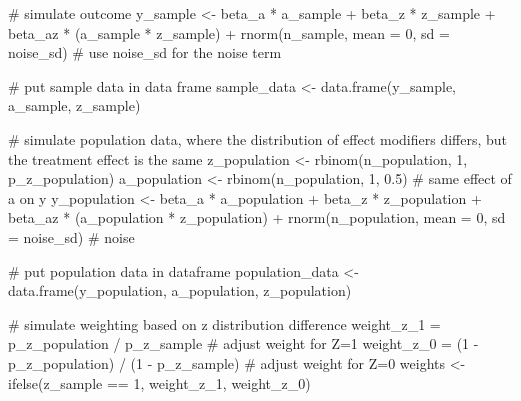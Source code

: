 \documentclass[
  singlecolumn]{article}
\newenvironment{Shaded}{\begin{snugshade}}{\end{snugshade}}
\newcommand{\AttributeTok}[1]{\textcolor[rgb]{0.40,0.45,0.13}{#1}}
\newcommand{\CommentTok}[1]{\textcolor[rgb]{0.37,0.37,0.37}{#1}}
\newcommand{\DecValTok}[1]{\textcolor[rgb]{0.68,0.00,0.00}{#1}}
\newcommand{\FloatTok}[1]{\textcolor[rgb]{0.68,0.00,0.00}{#1}}
\newcommand{\FunctionTok}[1]{\textcolor[rgb]{0.28,0.35,0.67}{#1}}
\newcommand{\NormalTok}[1]{\textcolor[rgb]{0.00,0.23,0.31}{#1}}
\newcommand{\OtherTok}[1]{\textcolor[rgb]{0.00,0.23,0.31}{#1}}
\newcommand{\SpecialCharTok}[1]{\textcolor[rgb]{0.37,0.37,0.37}{#1}}
\begin{document}
\begin{Shaded}
\begin{Highlighting}[]
  \CommentTok{\# simulate outcome}
\NormalTok{  y\_sample }\OtherTok{\textless{}{-}}\NormalTok{ beta\_a }\SpecialCharTok{*}\NormalTok{ a\_sample }\SpecialCharTok{+}\NormalTok{ beta\_z }\SpecialCharTok{*}\NormalTok{ z\_sample }\SpecialCharTok{+}\NormalTok{ beta\_az }\SpecialCharTok{*}\NormalTok{ (a\_sample }\SpecialCharTok{*}\NormalTok{ z\_sample) }\SpecialCharTok{+}
    \FunctionTok{rnorm}\NormalTok{(n\_sample, }\AttributeTok{mean =} \DecValTok{0}\NormalTok{, }\AttributeTok{sd =}\NormalTok{ noise\_sd)  }\CommentTok{\# use noise\_sd for the noise term}
  
  \CommentTok{\# put sample data in data frame}
\NormalTok{  sample\_data }\OtherTok{\textless{}{-}} \FunctionTok{data.frame}\NormalTok{(y\_sample, a\_sample, z\_sample)}
  
  \CommentTok{\# simulate population data, where the distribution of effect modifiers differs, but the treatment effect is the same}
\NormalTok{  z\_population }\OtherTok{\textless{}{-}} \FunctionTok{rbinom}\NormalTok{(n\_population, }\DecValTok{1}\NormalTok{, p\_z\_population)}
\NormalTok{  a\_population }\OtherTok{\textless{}{-}} \FunctionTok{rbinom}\NormalTok{(n\_population, }\DecValTok{1}\NormalTok{, }\FloatTok{0.5}\NormalTok{) }\CommentTok{\# same effect of a on y }
\NormalTok{  y\_population }\OtherTok{\textless{}{-}}\NormalTok{ beta\_a }\SpecialCharTok{*}\NormalTok{ a\_population }\SpecialCharTok{+}\NormalTok{ beta\_z }\SpecialCharTok{*}\NormalTok{ z\_population }\SpecialCharTok{+} 
\NormalTok{    beta\_az }\SpecialCharTok{*}\NormalTok{ (a\_population }\SpecialCharTok{*}\NormalTok{ z\_population) }\SpecialCharTok{+} \FunctionTok{rnorm}\NormalTok{(n\_population, }\AttributeTok{mean =} \DecValTok{0}\NormalTok{, }\AttributeTok{sd =}\NormalTok{ noise\_sd)  }\CommentTok{\# noise}
  
  \CommentTok{\# put population data in dataframe}
\NormalTok{  population\_data }\OtherTok{\textless{}{-}} \FunctionTok{data.frame}\NormalTok{(y\_population, a\_population, z\_population)}
  
  \CommentTok{\# simulate weighting based on z distribution difference}
\NormalTok{  weight\_z\_1 }\OtherTok{=}\NormalTok{ p\_z\_population }\SpecialCharTok{/}\NormalTok{ p\_z\_sample }\CommentTok{\# adjust weight for Z=1}
\NormalTok{  weight\_z\_0 }\OtherTok{=}\NormalTok{ (}\DecValTok{1} \SpecialCharTok{{-}}\NormalTok{ p\_z\_population) }\SpecialCharTok{/}\NormalTok{ (}\DecValTok{1} \SpecialCharTok{{-}}\NormalTok{ p\_z\_sample) }\CommentTok{\# adjust weight for Z=0}
\NormalTok{  weights }\OtherTok{\textless{}{-}} \FunctionTok{ifelse}\NormalTok{(z\_sample }\SpecialCharTok{==} \DecValTok{1}\NormalTok{, weight\_z\_1, weight\_z\_0)}
  

\end{Highlighting}
\end{Shaded}
\end{document}
